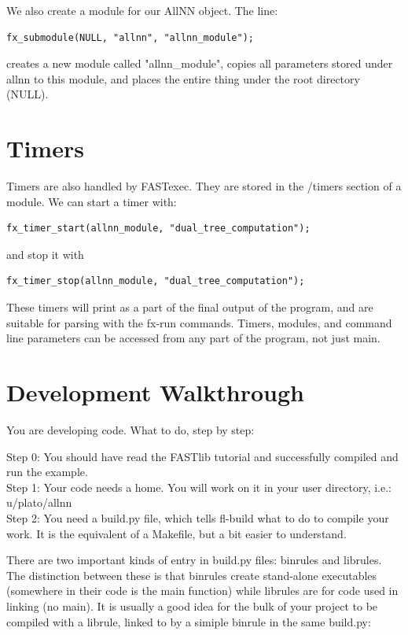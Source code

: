 \documentclass[letter]{report}
\begin{document}
We also create a module for our AllNN object. The line: 
\begin{verbatim}fx_submodule(NULL, "allnn", "allnn_module");\end{verbatim}
creates a new module called "allnn\_module", copies all parameters
stored under allnn to this module, and places the entire thing under
the root directory (NULL).

\section{Timers} 
Timers are also handled by FASTexec. They are stored in the /timers section of a module. We can start a timer with: 
\begin{verbatim}
fx_timer_start(allnn_module, "dual_tree_computation");
\end{verbatim}
and stop it with 
\begin{verbatim}
fx_timer_stop(allnn_module, "dual_tree_computation");
\end{verbatim}

These timers will print as a part of the final output of the program, and are suitable for parsing with the fx-run commands. 
Timers, modules, and command line parameters can be accessed from any part of the program, not just main. 

\section{Development Walkthrough}
You are developing code. What to do, step by step: 

Step 0: You should have read the FASTlib tutorial and successfully compiled and run the example.\\ 

Step 1: Your code needs a home. You will work on it in your user directory, i.e.: u/plato/allnn\\

Step 2: You need a build.py file, which tells fl-build what to do to compile your work. It is the equivalent of a Makefile, but a bit easier to understand. 

There are two important kinds of entry in build.py files: binrules and librules. The distinction between these is that binrules create stand-alone executables (somewhere in their code is the main function) while librules are for code used in linking (no main). It is usually a good idea for the bulk of your project to be compiled with a librule, linked to by a simiple binrule in the same build.py: 
\end{document}
